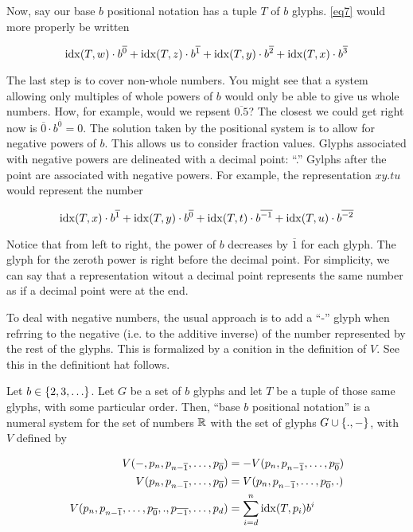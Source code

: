 \documentclass{article}
\begin{document}
	Now, say our base $b$ positional notation has a tuple $T$ of $b$ glyphs. \ref{eq7} would more properly be written
	
	\begin{equation}\label{eq10}
		\operatorname{idx}(T, w)\cdot b^{\overline{0}} + \operatorname{idx}(T, z)\cdot b^{\overline{1}} + \operatorname{idx}(T, y)\cdot b^{\overline{2}} + \operatorname{idx}(T, x)\cdot b^{\overline{3}}
	\end{equation}
	
	The last step is to cover non-whole numbers. You might see that a system allowing only multiples of whole powers of $b$ would only be able to give us whole numbers. How, for example, would we repsent $\overline{0.5}$? The closest we could get right now is $\overline{0}\cdot b^{\overline{0}} = 0$. The solution taken by the positional system is to allow for negative powers of $b$. This allows us to consider fraction values. Glyphs associated with negative powers are delineated with a decimal point: ``.''  Gylphs after the point are associated with negative powers. For example, the representation $xy.tu$ would represent the number
	
	\begin{equation}\label{eq11}
		\operatorname{idx}(T, x)\cdot b^{\overline{1}} + \operatorname{idx}(T, y)\cdot b^{\overline{0}} + \operatorname{idx}(T, t)\cdot b^{\overline{-1}} + \operatorname{idx}(T, u)\cdot b^{\overline{-2}}
	\end{equation}
	
	Notice that from left to right, the power of $b$ decreases by $\overline{1}$ for each glyph. The glyph for the zeroth power is right before the decimal point. For simplicity, we can say that a representation witout a decimal point represents the same number as if a decimal point were at the end.
	
	To deal with negative numbers, the usual approach is to add a ``-'' glyph when refrring to the negative (i.e. to the additive inverse) of the number represented by the rest of the glyphs. This is formalized by a conition in the definition of $V$. See this in the definitiont hat follows.
	
	\begin{definition}
		Let $b\in \Bqty{2, 3, \dots}$. Let $G$ be a set of $b$ glyphs and let $T$ be a tuple of those same glyphs, with some particular order. Then, ``base $b$ positional notation'' is  a numeral system for the set of numbers $\mathbb{R}$ with the set of glyphs $G\cup \Bqty{., -}$, with $V$ defined by
		
		\begin{equation}\label{eq12}
			\begin{split}
				V(-, p_{n}, p_{n-\overline{1}}, \dots, p_{\overline{0}})&=-V(p_{n}, p_{n-\overline{1}}, \dots, p_{\overline{0}})\\
				V(p_{n}, p_{n-\overline{1}}, \dots, p_{\overline{0}})&=V(p_{n}, p_{n-\overline{1}}, \dots, p_{\overline{0}}, .)\\
				V(p_{n}, p_{n-\overline{1}}, \dots, p_{\overline{0}}, ., p_{\overline{-1}}, \dots, p_{d}) &= \sum_{i=d}^{n}\operatorname{idx}(T, p_i)b^i
			\end{split}
		\end{equation}
	\end{definition}
	
\end{document}
